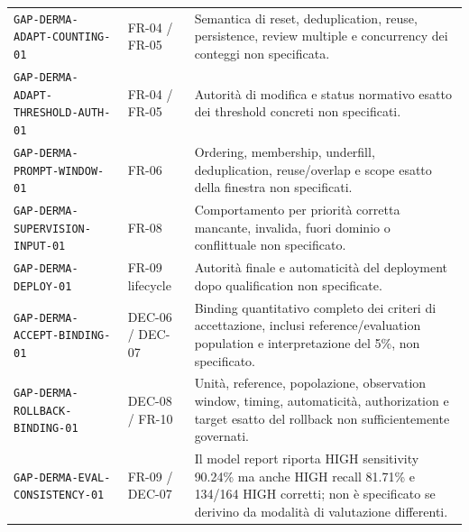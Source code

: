 \documentclass[11pt,a4paper]{article}
\begin{document}
\begin{longtable}{L{50mm}L{29mm}L{64mm}}
\nolinkurl{GAP-DERMA-ADAPT-COUNTING-01} & FR-04 / FR-05 & Semantica di reset, deduplication, reuse, persistence, review multiple e concurrency dei conteggi non specificata. \\
\nolinkurl{GAP-DERMA-ADAPT-THRESHOLD-AUTH-01} & FR-04 / FR-05 & Autorità di modifica e status normativo esatto dei threshold concreti non specificati. \\
\nolinkurl{GAP-DERMA-PROMPT-WINDOW-01} & FR-06 & Ordering, membership, underfill, deduplication, reuse/overlap e scope esatto della finestra non specificati. \\
\nolinkurl{GAP-DERMA-SUPERVISION-INPUT-01} & FR-08 & Comportamento per priorità corretta mancante, invalida, fuori dominio o conflittuale non specificato. \\
\nolinkurl{GAP-DERMA-DEPLOY-01} & FR-09 lifecycle & Autorità finale e automaticità del deployment dopo qualification non specificate. \\
\nolinkurl{GAP-DERMA-ACCEPT-BINDING-01} & DEC-06 / DEC-07 & Binding quantitativo completo dei criteri di accettazione, inclusi reference/evaluation population e interpretazione del 5\%, non specificato. \\
\nolinkurl{GAP-DERMA-ROLLBACK-BINDING-01} & DEC-08 / FR-10 & Unità, reference, popolazione, observation window, timing, automaticità, authorization e target esatto del rollback non sufficientemente governati. \\
\nolinkurl{GAP-DERMA-EVAL-CONSISTENCY-01} & FR-09 / DEC-07 & Il model report riporta HIGH sensitivity 90.24\% ma anche HIGH recall 81.71\% e 134/164 HIGH corretti; non è specificato se derivino da modalità di valutazione differenti. \\
\bottomrule
\end{longtable}
\normalsize
\end{document}
